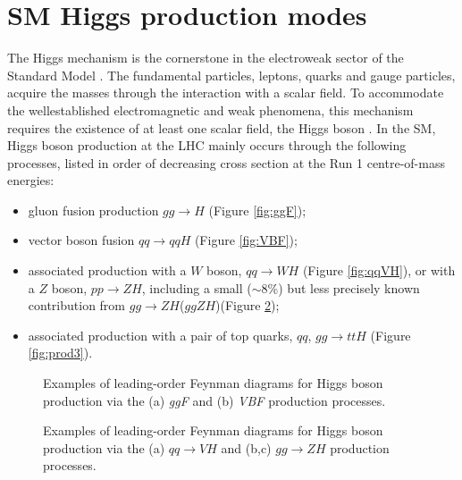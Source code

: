 \documentclass[a4paper, oneside, 11pt, openright]{book}
\begin{document}
 		\section{SM Higgs production modes}
 			The Higgs mechanism is the cornerstone in the electroweak sector of the Standard Model \cite{weinberg_1995}. The fundamental particles, leptons, quarks and gauge particles, acquire the masses through the interaction with a scalar ﬁeld. To accommodate the wellestablished electromagnetic and weak phenomena, this mechanism requires the existence of at least one scalar ﬁeld, the Higgs boson \cite{higgs_prod}. In the SM, Higgs boson production at the LHC mainly occurs through the following processes, listed in order of decreasing cross section at the Run 1 centre-of-mass energies:
 			\begin{itemize}
 				\item gluon fusion production $gg\to H$ (Figure \ref{fig:ggF});
 				\item vector boson fusion $qq\to qqH$ (Figure \ref{fig:VBF});
 				\item associated production with a $W$ boson, $qq\to WH$ (Figure \ref{fig:qqVH}), or with a $Z$ boson, $pp\to ZH$, including a small ($\sim$8\%) but less precisely known contribution from $gg\to ZH$($ggZH$)(Figure \ref{fig:prod2});
 				\item associated production with a pair of top quarks, $qq$, $gg\to ttH$ (Figure \ref{fig:prod3}).
 			\end{itemize}
 			\begin{figure}
 				\centering
 				\caption{Examples of leading-order Feynman diagrams for Higgs boson production via the (a) \textit{ggF} and (b) \textit{VBF} production processes.}
 				\label{fig:prod1}
 			\end{figure}
 			\begin{figure}
 				\centering
 				\hspace{.2cm}
 				\hspace{.2cm}				
 				\caption{Examples of leading-order Feynman diagrams for Higgs boson production via the (a) $qq\to VH$ and (b,c) $gg\to ZH$ production processes.}
 				\label{fig:prod2}
 			\end{figure}
\end{document}
